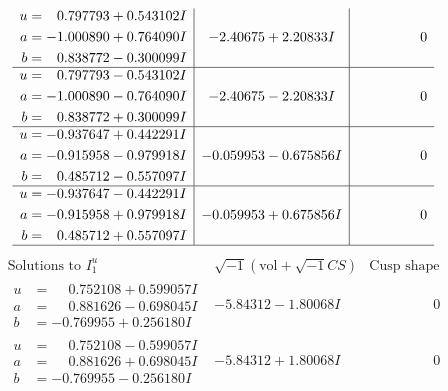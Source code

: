\documentclass[1p]{elsarticle_modified}
\theoremstyle{definition}
\newcommand{\I}{\sqrt{-1}}
\begin{document}
$$\begin{array}{c|c|c}
\begin{aligned}
u &= \phantom{-}0.797793 + 0.543102 I \\
a &= -1.000890 + 0.764090 I \\
b &= \phantom{-}0.838772 - 0.300099 I\end{aligned}
 & -2.40675 + 2.20833 I & \phantom{-0.000000 } 0 \\ \hline\begin{aligned}
u &= \phantom{-}0.797793 - 0.543102 I \\
a &= -1.000890 - 0.764090 I \\
b &= \phantom{-}0.838772 + 0.300099 I\end{aligned}
 & -2.40675 - 2.20833 I & \phantom{-0.000000 } 0 \\ \hline\begin{aligned}
u &= -0.937647 + 0.442291 I \\
a &= -0.915958 - 0.979918 I \\
b &= \phantom{-}0.485712 - 0.557097 I\end{aligned}
 & -0.059953 - 0.675856 I & \phantom{-0.000000 } 0 \\ \hline\begin{aligned}
u &= -0.937647 - 0.442291 I \\
a &= -0.915958 + 0.979918 I \\
b &= \phantom{-}0.485712 + 0.557097 I\end{aligned}
 & -0.059953 + 0.675856 I & \phantom{-0.000000 } 0\\
 \hline 
 \end{array}$$\newpage$$\begin{array}{c|c|c}  
\text{Solutions to }I^u_{1}& \I (\text{vol} + \sqrt{-1}CS) & \text{Cusp shape}\\
 \hline 
\begin{aligned}
u &= \phantom{-}0.752108 + 0.599057 I \\
a &= \phantom{-}0.881626 - 0.698045 I \\
b &= -0.769955 + 0.256180 I\end{aligned}
 & -5.84312 - 1.80068 I & \phantom{-0.000000 } 0 \\ \hline\begin{aligned}
u &= \phantom{-}0.752108 - 0.599057 I \\
a &= \phantom{-}0.881626 + 0.698045 I \\
b &= -0.769955 - 0.256180 I\end{aligned}
 & -5.84312 + 1.80068 I & \phantom{-0.000000 } 0 \\ \hline\begin{aligned}

\end{aligned}
\end{array}$$
\end{document}
